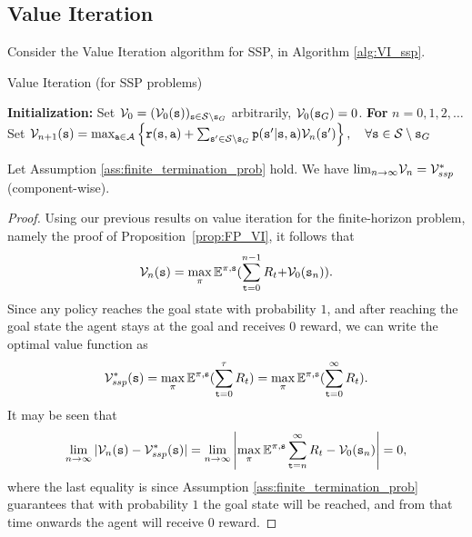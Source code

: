 \subsection{Value Iteration}
Consider the Value Iteration algorithm for SSP, in Algorithm \ref{alg:VI_ssp}.
\begin{algorithm}
\caption{Value Iteration (for SSP problems) }
\label{alg:VI_ssp}
\begin{algorithmic}[1]
\State \textbf{Initialization:} Set $\mathcal{V}_0 = (\mathcal{V}_0({\tt s}))_{{\tt s} \in \mathcal{S} \setminus {\tt s}_G}$ arbitrarily, $\mathcal{V}_0({\tt s}_G)=0$.
\State \textbf{For} {$n = 0, 1, 2, \ldots$}
    \State \quad Set $\mathcal{V}_{n + 1}({\tt s}) = \max_{{\tt a} \in \mathcal{A}} \left\{ {\tt r}({\tt s},{\tt a}) + \sum_{{\tt s}' \in \mathcal{S} \setminus {\tt s}_G} {\tt p}({\tt s}'|{\tt s},{\tt a})\mathcal{V}_n({\tt s}') \right\}, \quad \forall {\tt s} \in \mathcal{S} \setminus {\tt s}_G$
\end{algorithmic}
\end{algorithm}

\begin{theorem}\label{thm:_VI_ssp}
Let Assumption \ref{ass:finite_termination_prob} hold. We have ${\lim _{n \to \infty }}{\mathcal{V}_n} = \mathcal{V}_{ssp}^*$
(component-wise). 
\end{theorem}

\begin{proof}
Using our previous results on value iteration for the finite-horizon
problem, namely the proof of Proposition~\ref{prop:FP_VI}, it
follows that
\[{\mathcal{V}_n}({\tt s}) = \mathop {\max }\limits_\pi  {\ensuremath{\mathbb{E}}^{\pi,{\tt s}}}(\sum\limits_{{\tt t} = 0}^{n - 1} {{R_t} + } {\mathcal{V}_0}({{\tt s}_n})).\]
Since any policy reaches the goal state with probability $1$, and after reaching the goal state the agent stays at the goal and receives $0$ reward, we can write the optimal value function as
\[{\mathcal{V}_{ssp}^*}({\tt s}) = \mathop {\max }\limits_\pi  {\ensuremath{\mathbb{E}}^{\pi,{\tt s}}}(\sum\limits_{{\tt t} = 0}^\tau  {{R_t}} ) = \mathop {\max }\limits_\pi  {\ensuremath{\mathbb{E}}^{\pi,{\tt s}}}(\sum\limits_{{\tt t} = 0}^\infty  {{R_t}} ).\]
It may be seen  that
    \[\lim_{n \to \infty}|{\mathcal{V}_n}({\tt s}) - \mathcal{V}_{ssp}^*({\tt s})| = \lim_{n \to \infty} \left|\mathop {\max }\limits_\pi  {\ensuremath{\mathbb{E}}^{\pi,{\tt s}}} \sum\limits_{{\tt t} = n}^{\infty} {R_t} - {\mathcal{V}_0}({{\tt s}_n})\right| = 0,\]
where the last equality is since Assumption \ref{ass:finite_termination_prob} guarantees that with probability $1$ the goal state will be reached, and from that time onwards the agent will receive $0$ reward.
\end{proof}

